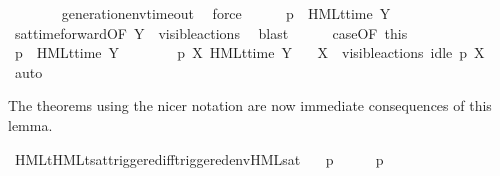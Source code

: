 \begin{isabellebody}
\ \ \ \ \ \ \isamarkupfalse%
\ generation{\isacharunderscore}{\kern0pt}env{\isacharunderscore}{\kern0pt}timeout\ \isamarkupfalse%
\ force{\isacharplus}{\kern0pt}\isanewline
\ \ \ \ \isamarkupfalse%
\ {\isacartoucheopen}{\isasymtheta}{\isacharparenleft}{\kern0pt}p{\isacharparenright}{\kern0pt}\ {\isasymTurnstile}\ {\isasymsigma}{\isacharparenleft}{\kern0pt}HMLt{\isacharunderscore}{\kern0pt}time\ Y\ {\isasymphi}{\isacharparenright}{\kern0pt}{\isacartoucheclose}\ \isamarkupfalse%
\ sat{\isacharunderscore}{\kern0pt}time{\isacharunderscore}{\kern0pt}forward{\isacharbrackleft}{\kern0pt}OF\ {\isacartoucheopen}Y\ {\isasymsubseteq}\ visible{\isacharunderscore}{\kern0pt}actions{\isacartoucheclose}{\isacharbrackright}{\kern0pt}\ \isamarkupfalse%
\ blast\isanewline
\ \ \ \ \isamarkupfalse%
\ case{}{\isacharbrackleft}{\kern0pt}OF\ this{\isacharbrackright}{\kern0pt}\ \isamarkupfalse%
\ {\isacartoucheopen}p\ {\isasymTTurnstile}\ HMLt{\isacharunderscore}{\kern0pt}time\ Y\ {\isasymphi}{\isacartoucheclose}\ \isacommand{{\isachardot}{\kern0pt}}\isamarkupfalse%
\isanewline
\isanewline
\ \ \ \ \isamarkupfalse%
\ {\isacartoucheopen}p\ {\isasymTTurnstile}{\isacharbrackleft}{\kern0pt}X{\isacharbrackright}{\kern0pt}\ HMLt{\isacharunderscore}{\kern0pt}time\ Y\ {\isasymphi}{\isacartoucheclose}\ \isamarkupfalse%
\ {\isacartoucheopen}X\ {\isasymsubseteq}\ visible{\isacharunderscore}{\kern0pt}actions{\isacartoucheclose}\ {\isacartoucheopen}idle\ p\ X{\isacartoucheclose}\ \isamarkupfalse%
\ auto\isanewline
\ \ \isamarkupfalse%
\isanewline
{}\isamarkupfalse%
%
\endisatagproof
{\isafoldproof}%
%
\isadelimproof
%
\endisadelimproof
%
\begin{isamarkuptext}%
The theorems using the nicer notation are now immediate consequences of this lemma.%
\end{isamarkuptext}\isamarkuptrue%
%
\isadelimvisible
%
\endisadelimvisible
%
\isatagvisible
{}\isamarkupfalse%
\ HMLt{\isacharunderscore}{\kern0pt}HMLt{\isacharunderscore}{\kern0pt}sat{\isacharunderscore}{\kern0pt}triggered{\isacharunderscore}{\kern0pt}iff{\isacharunderscore}{\kern0pt}triggered{\isacharunderscore}{\kern0pt}env{\isacharunderscore}{\kern0pt}HML{\isacharunderscore}{\kern0pt}sat{\isacharcolon}{\kern0pt}\isanewline
\ \ \ {\isacartoucheopen}p\ {\isasymTTurnstile}\ {\isasymphi}\ \ {\isasymLongleftrightarrow}\ \ {\isasymtheta}{\isacharparenleft}{\kern0pt}p{\isacharparenright}{\kern0pt}\ {\isasymTurnstile}\ {\isasymsigma}{\isacharparenleft}{\kern0pt}{\isasymphi}{\isacharparenright}{\kern0pt}{\isacartoucheclose}\ \isanewline

\end{isabellebody}
